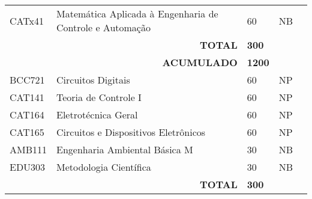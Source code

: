 \begin{table}[]
{\begin{tabular}{l|l|l|l|l}
			\multicolumn{1}{|l|}{CATx41}                        & Matemática Aplicada à Engenharia de Controle e Automação & 60                                                           & NB                      &  \\ \cline{1-4}
			\multicolumn{1}{|l|}{}                              & \multicolumn{1}{r|}{\textbf{TOTAL}}                      & \textbf{300}                                                 &                         &  \\ \cline{1-4}
			\multicolumn{1}{|l|}{}                              & \multicolumn{1}{r|}{\textbf{ACUMULADO}}                  & \textbf{1200}                                                &                         &  \\ \cline{1-4}
			\multicolumn{1}{|l|}{BCC721}                        & Circuitos Digitais                                       & 60                                                           & NP                      &  \\ \cline{1-4}
			\multicolumn{1}{|l|}{CAT141}                        & Teoria de Controle I                                     & 60                                                           & NP                      &  \\ \cline{1-4}
			\multicolumn{1}{|l|}{CAT164}                        & Eletrotécnica Geral                                      & 60                                                           & NP                      &  \\ \cline{1-4}
			\multicolumn{1}{|l|}{CAT165}                        & Circuitos e Dispositivos Eletrônicos                     & 60                                                           & NP                      &  \\ \cline{1-4}
			\multicolumn{1}{|l|}{AMB111}                        & Engenharia Ambiental Básica M                            & 30                                                           & NB                      &  \\ \cline{1-4}
			\multicolumn{1}{|l|}{EDU303}                        & Metodologia Científica                                   & 30                                                           & NB                      &  \\ \cline{1-4}
			\multicolumn{1}{|l|}{\textbf{}}                     & \multicolumn{1}{r|}{\textbf{TOTAL}}                      & \textbf{300}                                                 & \textbf{}               &  \\ \cline{1-4}

\end{tabular}}
\end{table}
